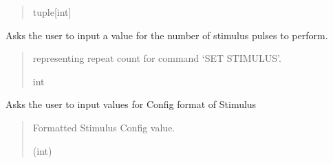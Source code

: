 \documentclass[letterpaper,10pt,english]{sphinxmanual}
\begin{document}
\begin{fulllineitems}
\begin{fulllineitems}
\begin{quote}
\begin{description}
\sphinxAtStartPar
tuple{[}int{]}

\end{description}\end{quote}

\end{fulllineitems}


\begin{fulllineitems}
\label{\detokenize{Setup_8480SC:Setup_8480SC.Setup_8480SC._ChooseRepeat}}
\pysigstartsignatures
{}
\pysigstopsignatures
\sphinxAtStartPar
Asks the user to input a value for the number of stimulus pulses to perform.
\begin{quote}\begin{description}
\sphinxAtStartPar
representing repeat count for command ‘SET STIMULUS’.

\sphinxAtStartPar
int

\end{description}\end{quote}

\end{fulllineitems}


\begin{fulllineitems}
\label{\detokenize{Setup_8480SC:Setup_8480SC.Setup_8480SC._ChooseStimulusConfig}}
\pysigstartsignatures
{}
\pysigstopsignatures
\sphinxAtStartPar
Asks the user to input values for Config format of Stimulus
\begin{quote}\begin{description}
\sphinxAtStartPar
Formatted Stimulus Config value.

\sphinxAtStartPar
(int)

\end{description}\end{quote}


\end{fulllineitems}
\end{fulllineitems}
\end{document}
